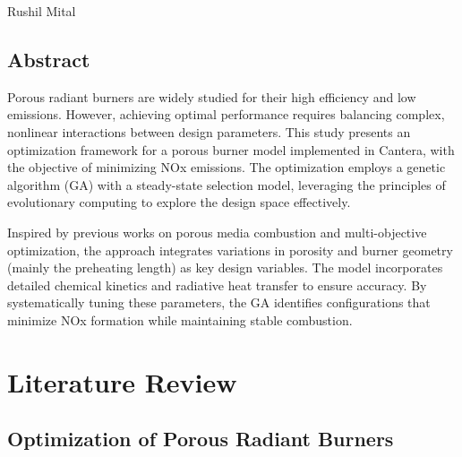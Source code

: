 \documentclass[12pt]{report}
\begin{document}
\vspace{1cm}
\begin{flushright}
Rushil Mital
\end{flushright}
\newpage
\section*{\centering Abstract}
Porous radiant burners are widely studied for their high efficiency and low emissions. However, achieving optimal performance requires balancing complex, nonlinear interactions between design parameters. This study presents an optimization framework for a porous burner model implemented in Cantera, with the objective of minimizing NOx emissions. The optimization employs a genetic algorithm (GA) with a steady-state selection model, leveraging the principles of evolutionary computing to explore the design space effectively. 

Inspired by previous works on porous media combustion and multi-objective optimization, the approach integrates variations in porosity and burner geometry (mainly the preheating length) as key design variables. The model incorporates detailed chemical kinetics and radiative heat transfer to ensure accuracy. By systematically tuning these parameters, the GA identifies configurations that minimize NOx formation while maintaining stable combustion. 



\tableofcontents


\begin{tabbing}
    
\end{tabbing}


\newpage


\chapter{Literature Review}

\section{Optimization of Porous Radiant Burners}
\end{document}
